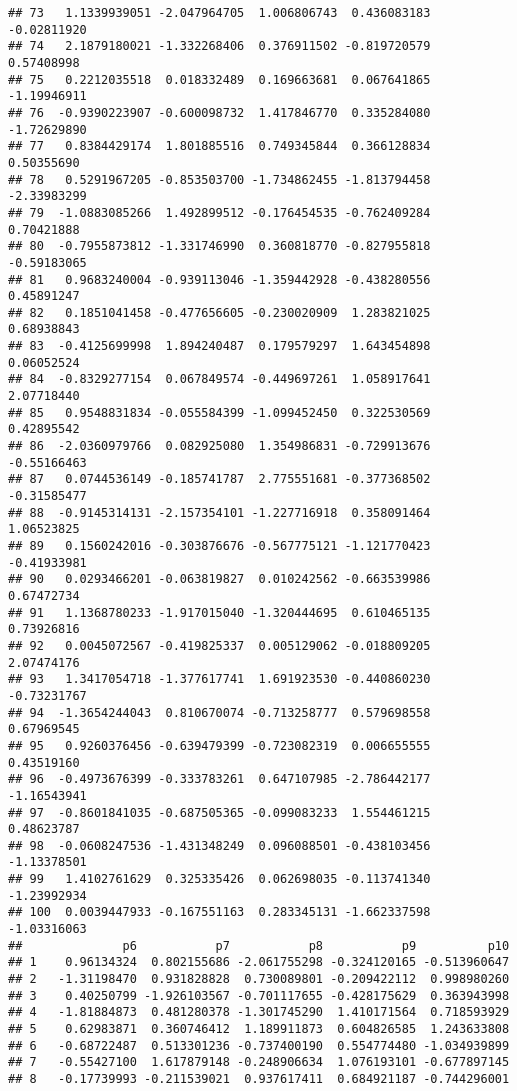 \documentclass[
]{article}
\begin{document}
\begin{verbatim}
## 73   1.1339939051 -2.047964705  1.006806743  0.436083183 -0.02811920
## 74   2.1879180021 -1.332268406  0.376911502 -0.819720579  0.57408998
## 75   0.2212035518  0.018332489  0.169663681  0.067641865 -1.19946911
## 76  -0.9390223907 -0.600098732  1.417846770  0.335284080 -1.72629890
## 77   0.8384429174  1.801885516  0.749345844  0.366128834  0.50355690
## 78   0.5291967205 -0.853503700 -1.734862455 -1.813794458 -2.33983299
## 79  -1.0883085266  1.492899512 -0.176454535 -0.762409284  0.70421888
## 80  -0.7955873812 -1.331746990  0.360818770 -0.827955818 -0.59183065
## 81   0.9683240004 -0.939113046 -1.359442928 -0.438280556  0.45891247
## 82   0.1851041458 -0.477656605 -0.230020909  1.283821025  0.68938843
## 83  -0.4125699998  1.894240487  0.179579297  1.643454898  0.06052524
## 84  -0.8329277154  0.067849574 -0.449697261  1.058917641  2.07718440
## 85   0.9548831834 -0.055584399 -1.099452450  0.322530569  0.42895542
## 86  -2.0360979766  0.082925080  1.354986831 -0.729913676 -0.55166463
## 87   0.0744536149 -0.185741787  2.775551681 -0.377368502 -0.31585477
## 88  -0.9145314131 -2.157354101 -1.227716918  0.358091464  1.06523825
## 89   0.1560242016 -0.303876676 -0.567775121 -1.121770423 -0.41933981
## 90   0.0293466201 -0.063819827  0.010242562 -0.663539986  0.67472734
## 91   1.1368780233 -1.917015040 -1.320444695  0.610465135  0.73926816
## 92   0.0045072567 -0.419825337  0.005129062 -0.018809205  2.07474176
## 93   1.3417054718 -1.377617741  1.691923530 -0.440860230 -0.73231767
## 94  -1.3654244043  0.810670074 -0.713258777  0.579698558  0.67969545
## 95   0.9260376456 -0.639479399 -0.723082319  0.006655555  0.43519160
## 96  -0.4973676399 -0.333783261  0.647107985 -2.786442177 -1.16543941
## 97  -0.8601841035 -0.687505365 -0.099083233  1.554461215  0.48623787
## 98  -0.0608247536 -1.431348249  0.096088501 -0.438103456 -1.13378501
## 99   1.4102761629  0.325335426  0.062698035 -0.113741340 -1.23992934
## 100  0.0039447933 -0.167551163  0.283345131 -1.662337598 -1.03316063
##              p6           p7           p8           p9          p10
## 1    0.96134324  0.802155686 -2.061755298 -0.324120165 -0.513960647
## 2   -1.31198470  0.931828828  0.730089801 -0.209422112  0.998980260
## 3    0.40250799 -1.926103567 -0.701117655 -0.428175629  0.363943998
## 4   -1.81884873  0.481280378 -1.301745290  1.410171564  0.718593929
## 5    0.62983871  0.360746412  1.189911873  0.604826585  1.243633808
## 6   -0.68722487  0.513301236 -0.737400190  0.554774480 -1.034939899
## 7   -0.55427100  1.617879148 -0.248906634  1.076193101 -0.677897145
## 8   -0.17739993 -0.211539021  0.937617411  0.684921187 -0.744296001

\end{verbatim}
\end{document}
